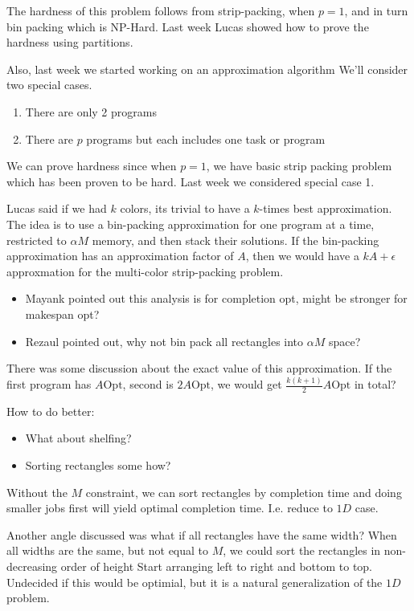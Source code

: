 \documentclass{article}
\begin{document}
The hardness of this problem follows from strip-packing, when $p = 1$, and in turn bin packing which is NP-Hard.
Last week Lucas showed how to prove the hardness using partitions.

Also, last week we started working on an approximation algorithm
We'll consider two special cases.
\begin{enumerate}
\item There are only 2 programs
\item There are $p$ programs but each includes one task or program
\end{enumerate}

We can prove hardness since when $p = 1$, we have basic strip packing problem
which has been proven to be hard. Last week we considered special case 1.

Lucas said if we had $k$ colors, its trivial to have a $k$-times best approximation.
The idea is to use a bin-packing approximation for one program at a time,
restricted to $\alpha M$ memory, and then stack their solutions.
If the bin-packing approximation has an approximation factor of $A$, then we would 
have a $kA + \epsilon$ approxmation for the multi-color strip-packing problem.

\begin{itemize}
  \item Mayank pointed out this analysis is for completion opt, 
might be stronger for makespan opt?

 \item Rezaul pointed out, why not bin pack all rectangles into $\alpha M$ space?
\end{itemize}

There was some discussion about the exact value of this approximation.
If the first program has  $A \text{Opt}$, second is $2 A \text{Opt}$,
we would get $\frac{k (k +1 )}{2} A \text{Opt}$ in total?

How to do better:
\begin{itemize}
  \item What about shelfing? 
  \item Sorting rectangles some how?
\end{itemize}

Without the $M$ constraint, we can sort rectangles by completion time and doing smaller jobs first will yield optimal completion time. I.e. reduce to $1D$ case.

Another angle discussed was what if all rectangles have the same width? 
When all widths are the same, but not equal to $M$, we could sort the rectangles in non-decreasing order of height
Start arranging left to right and bottom to top.
Undecided if this would be optimial, but it is a natural generalization of the $1D$ problem.
\end{document}

